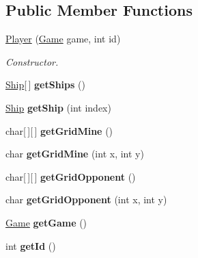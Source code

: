 \subsection*{Public Member Functions}
\begin{DoxyCompactItemize}
\item 
\hyperlink{classPlayer_a0444e17b6e068f2cbee6937244c8f921}{Player} (\hyperlink{classGame}{Game} game, int id)
\begin{DoxyCompactList}\small\item\em Constructor. \end{DoxyCompactList}\item 
\hyperlink{classShip}{Ship}\mbox{[}$\,$\mbox{]} {\bfseries get\+Ships} ()\hypertarget{classPlayer_a992bcaa016d561372f176b0021b624d2}{}\label{classPlayer_a992bcaa016d561372f176b0021b624d2}

\item 
\hyperlink{classShip}{Ship} {\bfseries get\+Ship} (int index)\hypertarget{classPlayer_af2d7d0a6c12ccb105fedf289516463ca}{}\label{classPlayer_af2d7d0a6c12ccb105fedf289516463ca}

\item 
char\mbox{[}$\,$\mbox{]}\mbox{[}$\,$\mbox{]} {\bfseries get\+Grid\+Mine} ()\hypertarget{classPlayer_ae9eb4d4e55b285791cdfa946f33042ae}{}\label{classPlayer_ae9eb4d4e55b285791cdfa946f33042ae}

\item 
char {\bfseries get\+Grid\+Mine} (int x, int y)\hypertarget{classPlayer_aee4d0aabd398122c3406d9a193d2fc33}{}\label{classPlayer_aee4d0aabd398122c3406d9a193d2fc33}

\item 
char\mbox{[}$\,$\mbox{]}\mbox{[}$\,$\mbox{]} {\bfseries get\+Grid\+Opponent} ()\hypertarget{classPlayer_ae8c3f7b3895e4d8f5e96f5f072bf7211}{}\label{classPlayer_ae8c3f7b3895e4d8f5e96f5f072bf7211}

\item 
char {\bfseries get\+Grid\+Opponent} (int x, int y)\hypertarget{classPlayer_ab82aed9ca2e326d51614a6287dd355d9}{}\label{classPlayer_ab82aed9ca2e326d51614a6287dd355d9}

\item 
\hyperlink{classGame}{Game} {\bfseries get\+Game} ()\hypertarget{classPlayer_a08580623035eedb19e8b7a028ad64914}{}\label{classPlayer_a08580623035eedb19e8b7a028ad64914}

\item 
int {\bfseries get\+Id} ()\hypertarget{classPlayer_adea0e90dc94ac68c20d672f801dc951a}{}\label{classPlayer_adea0e90dc94ac68c20d672f801dc951a}


\end{DoxyCompactItemize}
